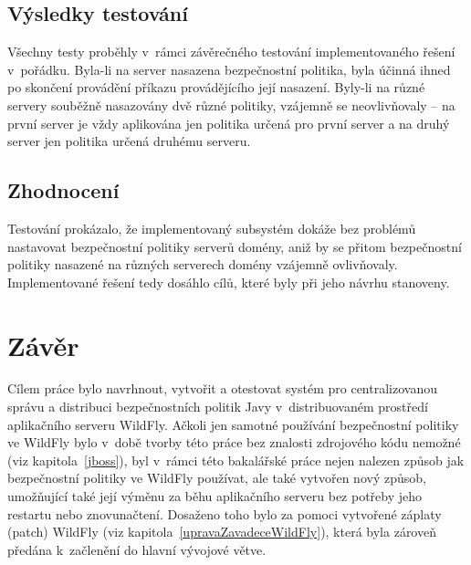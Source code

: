 \section{Výsledky testování}

Všechny testy proběhly v~rámci závěrečného testování implementovaného řešení v~pořádku.
Byla-li na server nasazena bezpečnostní politika, byla účinná ihned po skončení provádění příkazu provádějícího její nasazení.
Byly-li na různé servery souběžně nasazovány dvě různé politiky, vzájemně se neovlivňovaly -- na první server je vždy aplikována jen politika určená pro první server a na druhý server jen politika určená druhému serveru.

\section{Zhodnocení}

Testování prokázalo, že implementovaný subsystém dokáže bez problémů nastavovat bezpečnostní politiky serverů domény, aniž by se přitom bezpečnostní politiky nasazené na různých serverech domény vzájemně ovlivňovaly.
Implementované řešení tedy dosáhlo cílů, které byly při jeho návrhu stanoveny.

\chapter{Závěr}

Cílem práce bylo navrhnout, vytvořit a otestovat systém pro centralizovanou správu a distribuci bezpečnostních politik Javy v~distribuovaném prostředí aplikačního serveru WildFly.
Ačkoli jen samotné používání bezpečnostní politiky ve WildFly bylo v~době tvorby této práce bez znalosti zdrojového kódu nemožné (viz kapitola~\ref{jboss}),
byl v~rámci této bakalářské práce nejen nalezen způsob jak bezpečnostní politiky ve WildFly používat, ale také vytvořen nový způsob, umožňující také její výměnu za běhu aplikačního serveru bez potřeby jeho restartu nebo znovunačtení.
Dosaženo toho bylo za pomoci vytvořené záplaty (patch) WildFly (viz kapitola~\ref{upravaZavadeceWildFly}), která byla zároveň předána
k~začlenění do hlavní vývojové větve.~\cite{jmPullRequest}

